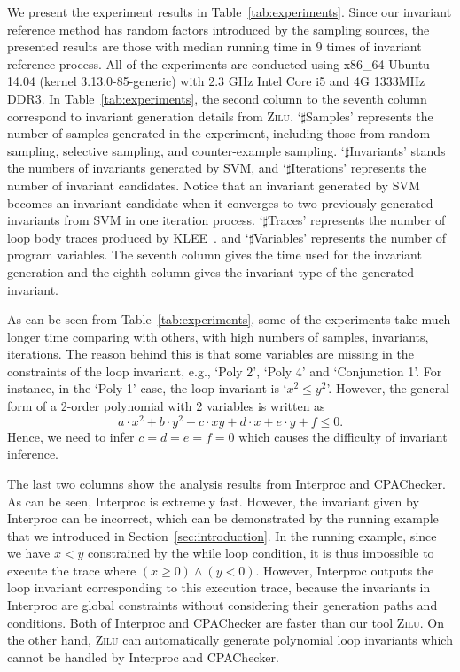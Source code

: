 We present the experiment results in Table~\ref{tab:experiments}. 
Since our invariant reference method has random factors introduced by the sampling sources, 
the presented results are those with median running time in $9$ times of invariant reference process. 
All of the experiments are conducted using x86\_64 Ubuntu 14.04 (kernel 3.13.0-85-generic) 
with 2.3 GHz Intel Core i5 and 4G 1333MHz DDR3. 
In Table~\ref{tab:experiments}, the second column to the seventh column correspond to 
invariant generation details from \textsc{Zilu}. 
`$\sharp$Samples' represents the number of samples generated in the experiment, 
including those from random sampling, selective sampling, and counter-example sampling. 
`$\sharp$Invariants' stands the numbers of invariants generated by SVM, 
and `$\sharp$Iterations' represents the number of invariant candidates. 
Notice that an invariant generated by SVM becomes an invariant candidate 
when it converges to two previously generated invariants from SVM in one iteration process. 
`$\sharp$Traces' represents the number of loop body traces produced by KLEE~\cite{cadar2008klee}. 
and `$\sharp$Variables' represents the number of program variables. 
The seventh column gives the time used for the invariant generation 
and the eighth column gives the invariant type of the generated invariant. 

As can be seen from Table~\ref{tab:experiments}, 
some of the experiments take much longer time comparing with others, 
with high numbers of samples, invariants, iterations. 
The reason behind this is 
that some variables are missing in the constraints of the loop invariant, 
e.g., `Poly 2', `Poly 4' and `Conjunction 1'.  
For instance, in the `Poly 1' case, the loop invariant is `$x^2 \le y^2$'. 
However, the general form of a 2-order polynomial with 2 variables 
is written as 
\[
    a \cdot x^2 + b \cdot y^2 + c \cdot x y + d \cdot x + e \cdot y + f \le 0. 
\] 
Hence, we need to infer $c = d = e = f = 0$ 
which causes the difficulty of invariant inference. 

The last two columns show the analysis results from Interproc and CPAChecker. 
As can be seen, Interproc is extremely fast. 
However, the invariant given by Interproc can be incorrect, 
which can be demonstrated by the running example 
that we introduced in Section~\ref{sec:introduction}. 
In the running example, since we have $x < y$ constrained by the while loop condition, 
it is thus impossible to execute the trace where $(x \ge 0) \land (y < 0)$. 
However, Interproc outputs the loop invariant corresponding to this execution trace, 
because the invariants in Interproc are global constraints 
without considering their generation paths and conditions. 
Both of Interproc and CPAChecker are faster than our tool \textsc{Zilu}. 
On the other hand, \textsc{Zilu} can automatically generate polynomial loop invariants 
which cannot be handled by Interproc and CPAChecker. 


